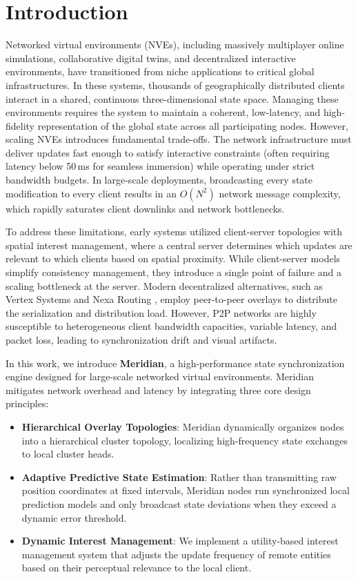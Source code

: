 \section{Introduction}
Networked virtual environments (NVEs), including massively multiplayer online simulations, collaborative digital twins, and decentralized interactive environments, have transitioned from niche applications to critical global infrastructures. In these systems, thousands of geographically distributed clients interact in a shared, continuous three-dimensional state space. Managing these environments requires the system to maintain a coherent, low-latency, and high-fidelity representation of the global state across all participating nodes. 
However, scaling NVEs introduces fundamental trade-offs. The network infrastructure must deliver updates fast enough to satisfy interactive constraints (often requiring latency below 50\,ms for seamless immersion) while operating under strict bandwidth budgets. In large-scale deployments, broadcasting every state modification to every client results in an $O(N^2)$ network message complexity, which rapidly saturates client downlinks and network bottlenecks.

To address these limitations, early systems utilized client-server topologies with spatial interest management, where a central server determines which updates are relevant to which clients based on spatial proximity. While client-server models simplify consistency management, they introduce a single point of failure and a scaling bottleneck at the server. Modern decentralized alternatives, such as Vertex Systems \cite{vertex2021latency} and Nexa Routing \cite{nexa2023scaling}, employ peer-to-peer overlays to distribute the serialization and distribution load. However, P2P networks are highly susceptible to heterogeneous client bandwidth capacities, variable latency, and packet loss, leading to synchronization drift and visual artifacts.

In this work, we introduce \textbf{Meridian}, a high-performance state synchronization engine designed for large-scale networked virtual environments. Meridian mitigates network overhead and latency by integrating three core design principles:
\begin{itemize}
    \item \textbf{Hierarchical Overlay Topologies}: Meridian dynamically organizes nodes into a hierarchical cluster topology, localizing high-frequency state exchanges to local cluster heads.
    \item \textbf{Adaptive Predictive State Estimation}: Rather than transmitting raw position coordinates at fixed intervals, Meridian nodes run synchronized local prediction models and only broadcast state deviations when they exceed a dynamic error threshold.
    \item \textbf{Dynamic Interest Management}: We implement a utility-based interest management system that adjusts the update frequency of remote entities based on their perceptual relevance to the local client.
\end{itemize}

